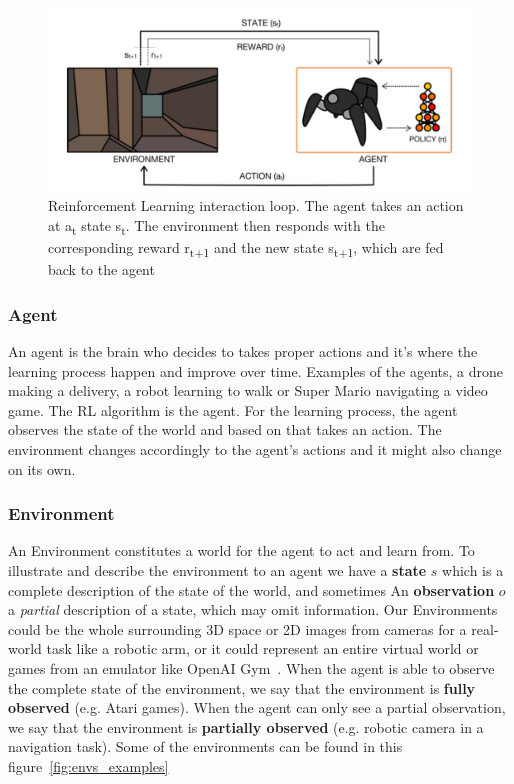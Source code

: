 \begin{figure}[!htb]
		\centering
		\includegraphics[width=.5\linewidth]{figures/Agent-Env.png}
		\caption{Reinforcement Learning interaction loop. The agent takes an action at a\textsubscript{t} state s\textsubscript{t}. The environment then responds with the corresponding reward r\textsubscript{t+1} and the new state s\textsubscript{t+1}, which are fed back to the agent~\parencite{arulkumaran2017brief}}
		\label{fig:agent_env}
\end{figure}

\subsubsection{Agent}\label{Agent}
An agent is the brain who decides to takes proper actions and it's where the learning process happen and improve over time. Examples of the agents, a drone making a delivery, a robot learning to walk or Super Mario navigating a video game. The RL algorithm is the agent. For the learning process, the agent observes the state of the world and based on that takes an action. The environment changes accordingly to the agent's actions and it might also change on its own. 


\subsubsection{Environment}\label{Environment}
An Environment constitutes a world for the agent to act and learn from. 
To illustrate and describe the environment to an agent we have a \textbf{state} \(s\) which is a complete description of the state of the world, and sometimes An \textbf{observation} \(o\) a \textit{partial} description of a state, which may omit information.
Our Environments could be the whole surrounding 3D space or 2D images from cameras for a real-world task like a robotic arm, or it could represent an entire virtual world or games from an emulator like OpenAI Gym~\parencite{brockman2016openai}.
When the agent is able to observe the complete state of the environment, we say that the environment is \textbf{fully observed} (e.g. Atari games). When the agent can only see a partial observation, we say that the environment is \textbf{partially observed} (e.g. robotic camera in a navigation task).
Some of the environments can be found in this figure~\ref{fig:envs_examples}

